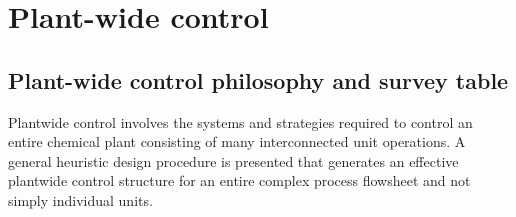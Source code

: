 \section{Plant-wide control}

\subsection{Plant-wide control philosophy and survey table}%






Plantwide control involves the systems and  strategies  required  to control an entire chemical plant consisting of  many interconnected unit operations. A general  heuristic design procedure is presented that generates an effective plantwide control structure for an entire complex process flowsheet and not simply individual units.

